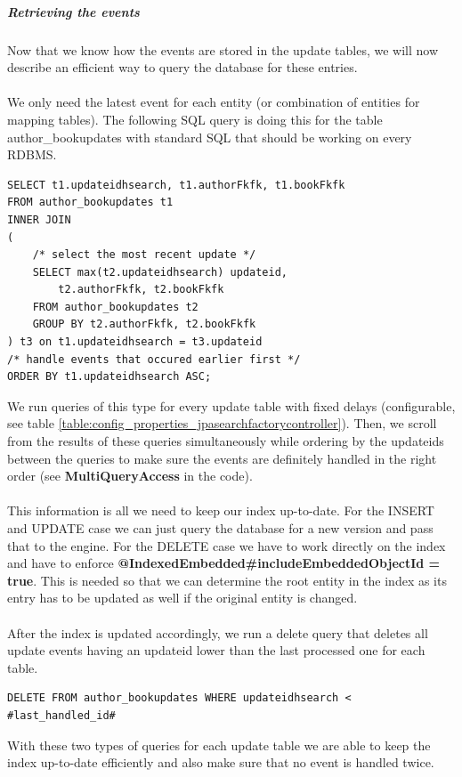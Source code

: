 \subparagraph{Retrieving the events}
Now that we know how the events are stored in the update tables, we will now describe an efficient way to query the database for these entries.
\\\\
We only need the latest event for each entity (or combination of entities for mapping tables). The following SQL query is doing this for the table author\_bookupdates with standard SQL that should be working on every RDBMS.
\\
\lstset{language=sql}
\begin{lstlisting}[frame=htrbl, caption={Querying for updates (Author\_Book)},
label={lst:querying_updates.sql}]
SELECT t1.updateidhsearch, t1.authorFkfk, t1.bookFkfk
FROM author_bookupdates t1
INNER JOIN
(
	/* select the most recent update */
	SELECT max(t2.updateidhsearch) updateid, 
		t2.authorFkfk, t2.bookFkfk
	FROM author_bookupdates t2
	GROUP BY t2.authorFkfk, t2.bookFkfk
) t3 on t1.updateidhsearch = t3.updateid
/* handle events that occured earlier first */
ORDER BY t1.updateidhsearch ASC;
\end{lstlisting}
\noindent
We run queries of this type for every update table with fixed delays (configurable, see table \ref{table:config_properties_jpasearchfactorycontroller}). Then, we scroll from the results
of these queries simultaneously while ordering by the updateids between the queries to make sure the events are definitely handled in the right order (see \textbf{MultiQueryAccess} in the code).
\\\\
This information is all we need to keep our index up-to-date. For the INSERT and UPDATE case we can just query the database for a new version and pass that to the engine. For the DELETE case we have to work directly on the index and have to enforce  \textbf{@IndexedEmbedded\#includeEmbeddedObjectId = true}. This is needed so that we can determine the root entity in the index as its entry has to be updated as well if the original entity is changed.
\\\\
After the index is updated accordingly, we run a delete query that deletes all update events
having an updateid lower than the last processed one for each table.
\\
\lstset{language=sql}
\begin{lstlisting}[frame=htrbl, caption={Deleting handled updates (Author\_Book)},
label={lst:deleting_updates.sql}]
DELETE FROM author_bookupdates WHERE updateidhsearch < #last_handled_id#
\end{lstlisting}
\noindent
With these two types of queries for each update table we are able to keep the index up-to-date efficiently and also make sure that no event is handled twice.

